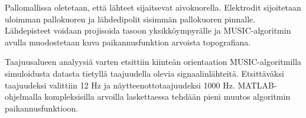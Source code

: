 Pallomallissa oletetaan, että lähteet sijaitsevat aivokuorella. Elektrodit sijoitetaan uloimman pallokuoren ja lähdedipolit sisimmän pallokuoren pinnalle. Lähdepisteet voidaan projisoida tasoon yksikköympyrälle ja MUSIC-algoritmin avulla muodostetaan kuva paikannusfunktion arvoista topografiana.

Taajuusalueen analyysiä varten etsittiin kiinteän orientaation MUSIC-algoritmilla simuloidusta datasta tietyllä taajuudella olevia signaalinlähteitä. Etsittäväksi taajuudeksi valittiin 12 Hz ja näytteenottotaajuudeksi 1000 Hz. MATLAB-ohjelmalla kompleksisilla arvoilla laskettaessa tehdään pieni muutos algoritmin paikannusfunktioon. 
